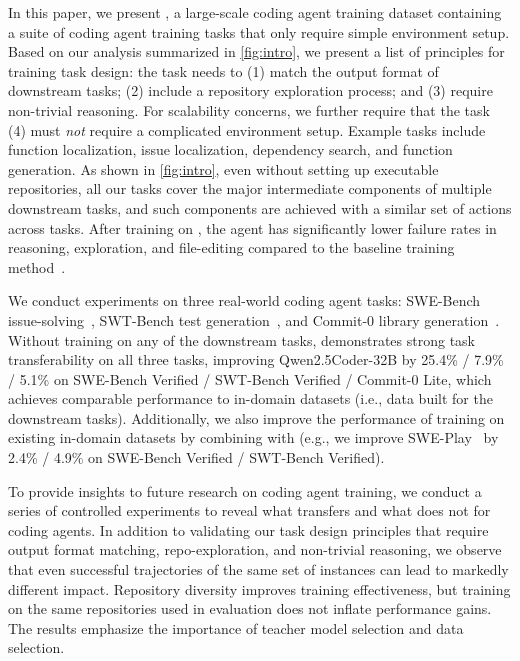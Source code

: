 In this paper, we present \hybridmethodname, a large-scale coding agent training dataset containing a suite of coding agent training tasks that only require simple environment setup.
Based on our analysis summarized in \autoref{fig:intro}, we present a list of principles for training task design: the task needs to 
(1) match the output format of downstream tasks;
(2) include a repository exploration process; and 
(3) require non-trivial reasoning.
For scalability concerns, we further require that the task (4) must \emph{not} require a complicated environment setup.
Example tasks include function localization, issue localization, dependency search, and function generation.
As shown in \autoref{fig:intro}, even without setting up executable repositories, all our tasks cover the major intermediate components of multiple downstream tasks, and such components are achieved with a similar set of actions across tasks. 
After training on \hybridmethodname, the agent has significantly lower failure rates in reasoning, exploration, and file-editing compared to the baseline training method~\cite{swegym}.


We conduct experiments on three real-world coding agent tasks: SWE-Bench issue-solving~\citep{swebench}, SWT-Bench test generation~\citep{swt-bench}, and Commit-0 library generation~\citep{commit0}.
Without training on any of the downstream tasks, \hybridmethodname demonstrates strong task transferability on all three tasks, improving Qwen2.5Coder-32B by 25.4\% / 7.9\% / 5.1\% on SWE-Bench Verified / SWT-Bench Verified / Commit-0 Lite, which achieves comparable performance to in-domain datasets (i.e., data built for the downstream tasks). 
Additionally, we also improve the performance of training on existing in-domain datasets by combining with \hybridmethodname (e.g., we improve SWE-Play~\citep{swe-play} by 2.4\% / 4.9\% on SWE-Bench Verified / SWT-Bench Verified).


To provide insights to future research on coding agent training, we conduct a series of controlled experiments to reveal what transfers and what does not for coding agents.
In addition to validating our task design principles that require output format matching, repo-exploration, and non-trivial reasoning, we observe that even successful trajectories of the same set of instances can lead to markedly different impact.
Repository diversity improves training effectiveness, but training on the same repositories used in evaluation does not inflate performance gains.
The results emphasize the importance of teacher model selection and data selection.





